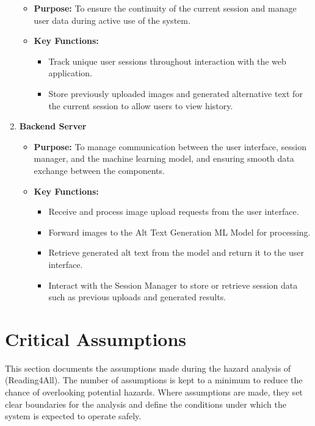 \documentclass{article}
\begin{document}
\begin{enumerate}
\begin{itemize}
      \item \textbf{Purpose:} To ensure the continuity of the current
        session and manage user data during active use of the system.
      \item \textbf{Key Functions:}
        \begin{itemize}
          \item Track unique user sessions throughout interaction
            with the web application.
          \item Store previously uploaded images and generated
            alternative text for the current session to allow users
            to view history.
        \end{itemize}
    \end{itemize}
    \item \textbf{Backend Server}
    \begin{itemize}
        \item \textbf{Purpose:} To manage communication between the user interface, session manager, and the machine learning model, and ensuring smooth data exchange between the components.
        \item \textbf{Key Functions:}
        \begin{itemize}
            \item Receive and process image upload requests from the user interface.
            \item Forward images to the Alt Text Generation ML Model for processing.
            \item Retrieve generated alt text from the model and return it to the user interface. 
            \item Interact with the Session Manager to store or retrieve session data such as previous uploads and generated results.
        \end{itemize}
    \end{itemize}
\end{enumerate}
\section{Critical Assumptions}
This section documents the assumptions made during the hazard analysis of
\progname{} (Reading4All). The number of assumptions is kept to a minimum
to reduce the chance of overlooking potential hazards. Where assumptions
are made, they set clear boundaries for the analysis and define the
conditions under which the system is expected to operate safely.
\end{document}
